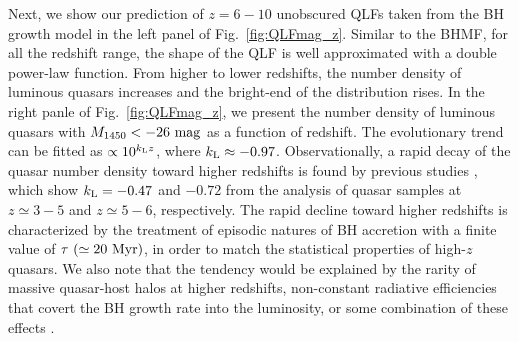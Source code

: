 \documentclass[twocolumn, twocolappendix]{aastex63}
\newcommand{\Muv}{M_{1450}}
\newcommand{\red}[1]{\textcolor{red}{ #1}}
\begin{document}
\begin{CJK*}{UTF8}{gbsn}
Next, we show our prediction of $z=6-10$ unobscured QLFs taken from the BH growth model in the left panel of Fig.~\ref{fig:QLFmag_z}.
Similar to the BHMF, for all the redshift range, the shape of the QLF is well approximated with a double power-law function.
From higher to lower redshifts, the number density of luminous quasars increases and the bright-end of the distribution rises.
In the right panle of Fig.~\ref{fig:QLFmag_z}, we present the number density of luminous quasars with $\Muv <-26~{\rm mag}$ as a function of redshift.
The evolutionary trend can be fitted as $\propto 10^{k_{\rm L}z}$, where $k_{\rm L}\approx -0.97$.
Observationally, a rapid decay of the quasar number density toward higher redshifts is found by previous studies
\citep[e.g.,][]{2001AJ....122.2833F,2013ApJ...768..105M,2016ApJ...833..222J,2019ApJ...884...30W},
which show $k_{\rm L}= -0.47$ and $-0.72$ from the analysis of quasar samples at $z\simeq 3-5$ and $z\simeq 5-6$, respectively.
The rapid decline toward higher redshifts is characterized by the treatment of episodic natures of BH accretion with a finite value of
$\tau ~(\simeq 20~{\rm Myr})$, in order to match the statistical properties of high-$z$ quasars.
We also note that the tendency would be explained by the rarity of massive quasar-host halos at higher redshifts,
non-constant radiative efficiencies that covert the BH growth rate into the luminosity, or some combination of these effects
\citep[e.g.,][]{2010ApJ...718..231S}.
\fi



\end{CJK*}
\end{document}
